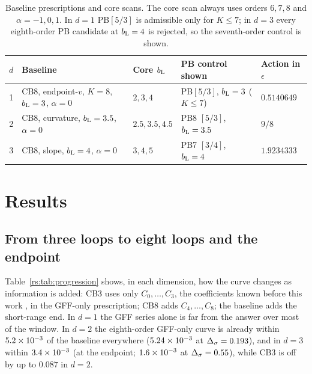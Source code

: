 \begin{table}[htbp]\centering\small\setlength{\tabcolsep}{4pt}
\begin{tabular}{@{}c l l l l@{}}
\toprule
$d$ & Baseline & Core $b_{\mathrm L}$ & PB control shown & Action in $\epsilon$\\ \midrule
1 & CB8, endpoint-$v$, $K=8$, $b_{\mathrm L}=3$, $\alpha=0$ & $2,3,4$ & PB$[5/3]$, $b_{\mathrm L}=3$ ($K\le7$) & $0.5140649$\\
2 & CB8, curvature, $b_{\mathrm L}=3.5$, $\alpha=0$ & $2.5,3.5,4.5$ & PB8 $[5/3]$, $b_{\mathrm L}=3.5$ & $9/8$\\
3 & CB8, slope, $b_{\mathrm L}=4$, $\alpha=0$ & $3,4,5$ & PB7 $[3/4]$, $b_{\mathrm L}=4$ & $1.9234333$\\
\bottomrule
\end{tabular}
\caption{Baseline prescriptions and core scans. The core scan always uses orders $6,7,8$ and
$\alpha=-1,0,1$. In $d=1$ PB$[5/3]$ is admissible only for $K\le7$; in $d=3$ every eighth-order
PB candidate at $b_{\mathrm L}=4$ is rejected, so the seventh-order control is shown.}
\label{rs:tab:scans}
\end{table}

\section{Results}\label{rs:sec:results}
\subsection{From three loops to eight loops and the endpoint}
Table~\ref{rs:tab:progression} shows, in each dimension, how the curve changes as
information is added: CB3 uses only $C_0,\dots,C_3$, the coefficients known before this
work \cite{rs:Benedetti:2020rrq}, in the GFF-only prescription; CB8 adds $C_4,\dots,C_8$; the baseline adds the
short-range end. In $d=1$ the GFF series alone is far from the answer over most of the
window. In $d=2$ the eighth-order GFF-only curve is already within $5.2\times10^{-3}$ of the
baseline everywhere ($5.24\times10^{-3}$ at $\Delta_\sigma=0.193$), and in $d=3$ within $3.4\times10^{-3}$ (at the endpoint;
$1.6\times10^{-3}$ at $\Delta_\sigma=0.55$), while CB3 is off by up to $0.087$ in $d=2$.

